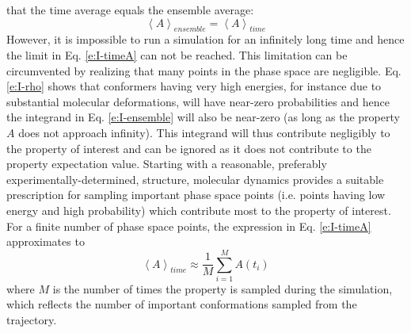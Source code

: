 \documentclass[11pt]{report}
\begin{document}
that the time average equals the ensemble average:
\begin{equation}
\left< A \right>_{ensemble} = \left< A \right>_{time}
\end{equation}
However, it is impossible to run a simulation for
an infinitely long time and hence the limit in
Eq. \ref{e:I-timeA} can not be reached.
This limitation can be circumvented by
realizing that many points in the phase space
are negligible. Eq. \ref{e:I-rho} shows that
conformers having very high energies,
for instance due to substantial molecular deformations, will
have near-zero probabilities and hence
the integrand in Eq. \ref{e:I-ensemble}
will also be near-zero (as long as the
property $A$ does not approach infinity).
This integrand will thus contribute negligibly
to the property of interest and can be ignored
as it does not contribute to the property
expectation value. Starting with a reasonable,
preferably experimentally-determined,
structure, molecular dynamics provides
a suitable prescription for sampling important
phase space points (i.e. points having low energy and
high probability) which contribute most
to the property of interest. For a finite
number of phase space points, the 
expression in Eq. \ref{e:I-timeA} approximates
to
\begin{equation}
\left< A \right>_{time}  \approx \frac{1}{M}
\sum_{i=1}^{M} A(t_i)
\end{equation}
where $M$ is the number of times the property is
sampled during the simulation, which reflects
the number of important conformations sampled
from the trajectory.
\end{document}
